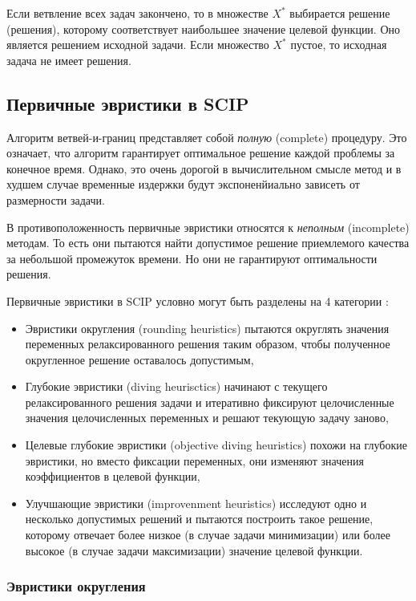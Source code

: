 \documentclass[%
	11pt,
	a4paper,
	utf8,
		]{article}
\begin{document}
Если ветвление всех задач закончено, то в множестве $ X^* $ выбирается решение (решения), которому соответствует наибольшее значение целевой функции. Оно является решением исходной задачи. Если множество $ X^* $ пустое, то исходная задача не имеет решения.

\subsection{Первичные эвристики в SCIP}

Алгоритм ветвей-и-границ представляет собой \emph{полную} (complete) процедуру. Это означает, что алгоритм гарантирует оптимальное решение каждой проблемы за конечное время. Однако, это очень дорогой в вычислительном смысле метод и в худшем случае временные издержки будут экспоненйиально зависеть от размерности задачи.

В противоположенность первичные эвристики относятся к \emph{неполным} (incomplete) методам. То есть они пытаются найти допустимое решение приемлемого качества за небольшой промежуток времени. Но они не гарантируют оптимальности решения.

Первичные эвристики в SCIP условно могут быть разделены на 4 категории \cite{achterberg:constr_int_prog}:
\begin{itemize}
	\item Эвристики округления (rounding heuristics) пытаются округлять значения переменных релаксированного решения таким образом, чтобы полученное округленное решение оставалось допустимым,
	
	\item Глубокие эвристики (diving heurisctics) начинают с текущего релаксированного решения задачи и итеративно фиксируют целочисленные значения целочисленных переменных и решают текующую задачу заново,
	
	\item Целевые глубокие эвристики (objective diving heuristics) похожи на глубокие эвристики, но вместо фиксации переменных, они изменяют значения коэффициентов в целевой функции,
	
	\item Улучшающие эвристики (improvenment heuristics) исследуют одно и несколько допустимых решений и пытаются построить такое решение, которому отвечает более низкое (в случае задачи минимизации) или более высокое (в случае задачи максимизации) значение целевой функции.
\end{itemize}

\subsubsection{Эвристики округления}
\end{document}

